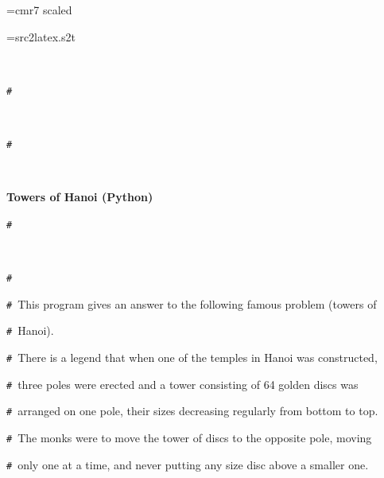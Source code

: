 \documentclass{article}
\begin{document}
\ifx\sevenrm\undefined
  \font\sevenrm=cmr7 scaled 
\fi

\newread\MyStyle
\openin\MyStyle=src2latex.s2t
\ifeof\MyStyle
  \closein\MyStyle
\else
  
  \closein\MyStyle
\fi

\def\mc{\relax}
\def\gt{\relax}
\def\sc{\scshape}

\tt\mc 

\noindent
\rm\mc {\tt\#}\  \hrulefill  \rm\mc 

\noindent
\mbox{}{\tt\#}
\tt\mc 

\noindent
\mbox{}\rm\mc {\tt\#}\  {}%

\noindent
\mbox{}{\tt\#}
\tt\mc 

\noindent
\mbox{}\rm\mc {\tt\#}\  {}\centerline{\bf Towers of Hanoi (Python)}  \rm\mc 

\noindent
\mbox{}{\tt\#}
\tt\mc 

\noindent
\mbox{}\rm\mc {\tt\#}\  {}  \rm\mc 

\noindent
\mbox{}{\tt\#}\  {}\hspace{\leftmargini}\noindent  \rm\mc 

\noindent
\mbox{}{\tt\#}\  {}\hspace{\leftmargini}This program gives an answer to the following famous problem (towers of  \rm\mc 

\noindent
\mbox{}{\tt\#}\  {}\hspace{\leftmargini}Hanoi).  \rm\mc 

\noindent
\mbox{}{\tt\#}\  {}\hspace{\leftmargini}There is a legend that when one of the temples in Hanoi was constructed,  \rm\mc 

\noindent
\mbox{}{\tt\#}\  {}\hspace{\leftmargini}three poles were erected and a tower consisting of 64 golden discs was  \rm\mc 

\noindent
\mbox{}{\tt\#}\  {}\hspace{\leftmargini}arranged on one pole, their sizes decreasing regularly from bottom to top.  \rm\mc 

\noindent
\mbox{}{\tt\#}\  {}\hspace{\leftmargini}The monks were to move the tower of discs to the opposite pole, moving  \rm\mc 

\noindent
\mbox{}{\tt\#}\  {}\hspace{\leftmargini}only one at a time, and never putting any size disc above a smaller one.  \rm\mc 
\end{document}
